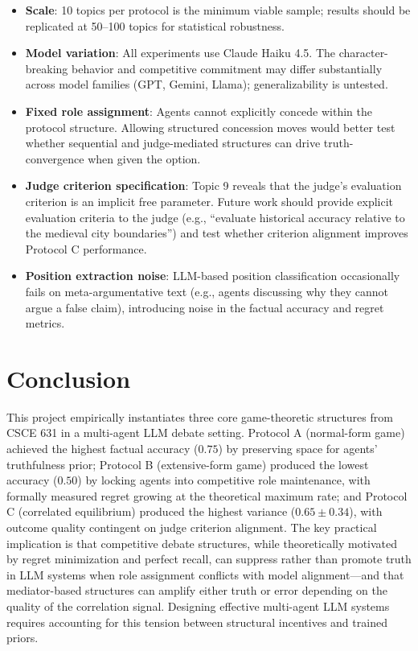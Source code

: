 \documentclass[11pt, oneside]{article}
\begin{document}
\begin{itemize}
\item \textbf{Scale}: 10 topics per protocol is the minimum viable sample; results should be replicated at 50--100 topics for statistical robustness.
\item \textbf{Model variation}: All experiments use Claude Haiku 4.5. The character-breaking behavior and competitive commitment may differ substantially across model families (GPT, Gemini, Llama); generalizability is untested.
\item \textbf{Fixed role assignment}: Agents cannot explicitly concede within the protocol structure. Allowing structured concession moves would better test whether sequential and judge-mediated structures can drive truth-convergence when given the option.
\item \textbf{Judge criterion specification}: Topic 9 reveals that the judge's evaluation criterion is an implicit free parameter. Future work should provide explicit evaluation criteria to the judge (e.g., ``evaluate historical accuracy relative to the medieval city boundaries'') and test whether criterion alignment improves Protocol C performance.
\item \textbf{Position extraction noise}: LLM-based position classification occasionally fails on meta-argumentative text (e.g., agents discussing why they cannot argue a false claim), introducing noise in the factual accuracy and regret metrics.
\end{itemize}

\section{Conclusion}

This project empirically instantiates three core game-theoretic structures from CSCE 631 in a multi-agent LLM debate setting. Protocol A (normal-form game) achieved the highest factual accuracy ($0.75$) by preserving space for agents' truthfulness prior; Protocol B (extensive-form game) produced the lowest accuracy ($0.50$) by locking agents into competitive role maintenance, with formally measured regret growing at the theoretical maximum rate; and Protocol C (correlated equilibrium) produced the highest variance ($0.65 \pm 0.34$), with outcome quality contingent on judge criterion alignment. The key practical implication is that competitive debate structures, while theoretically motivated by regret minimization and perfect recall, can suppress rather than promote truth in LLM systems when role assignment conflicts with model alignment---and that mediator-based structures can amplify either truth or error depending on the quality of the correlation signal. Designing effective multi-agent LLM systems requires accounting for this tension between structural incentives and trained priors.
\end{document}
